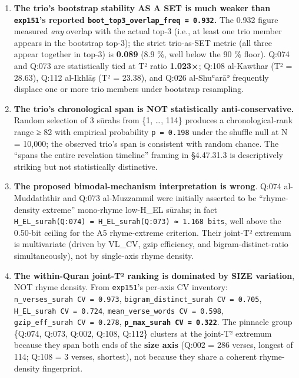 \documentclass[
]{article}
\providecommand{\tightlist}{%
  \setlength{\itemsep}{0pt}\setlength{\parskip}{0pt}}
\begin{document}
\begin{enumerate}
\def\labelenumi{\arabic{enumi}.}
\tightlist
\item
  \textbf{The trio's bootstrap stability AS A SET is much weaker than
  \texttt{exp151}'s reported
  \texttt{boot\_top3\_overlap\_freq\ =\ 0.932}.} The 0.932 figure
  measured \emph{any} overlap with the actual top-3 (i.e., at least one
  trio member appears in the bootstrap top-3); the strict trio-as-SET
  metric (all three appear together in top-3) is \textbf{0.089} (8.9 \%,
  well below the 90 \% floor). Q:074 and Q:073 are statistically tied at
  T² ratio \textbf{1.023×}; Q:108 al-Kawthar (T² = 28.63), Q:112
  al-Ikhlāṣ (T² = 23.38), and Q:026 al-Shuʿarāʾ frequently displace one
  or more trio members under bootstrap resampling.
\item
  \textbf{The trio's chronological span is NOT statistically
  anti-conservative.} Random selection of 3 sūrahs from \{1, \ldots,
  114\} produces a chronological-rank range ≥ 82 with empirical
  probability \texttt{p\ =\ 0.198} under the shuffle null at N = 10,000;
  the observed trio's span is consistent with random chance. The ``spans
  the entire revelation timeline'' framing in §4.47.31.3 is
  descriptively striking but not statistically distinctive.
\item
  \textbf{The proposed bimodal-mechanism interpretation is wrong}. Q:074
  al-Muddaththir and Q:073 al-Muzzammil were initially asserted to be
  ``rhyme-density extreme'' mono-rhyme low-H\_EL sūrahs; in fact
  \texttt{H\_EL\_surah(Q:074)\ =\ H\_EL\_surah(Q:073)\ ≈\ 1.168\ bits},
  well above the 0.50-bit ceiling for the A5 rhyme-extreme criterion.
  Their joint-T² extremum is multivariate (driven by VL\_CV, gzip
  efficiency, and bigram-distinct-ratio simultaneously), not by
  single-axis rhyme density.
\item
  \textbf{The within-Quran joint-T² ranking is dominated by SIZE
  variation}, NOT rhyme density. From \texttt{exp151}'s per-axis CV
  inventory: \texttt{n\_verses\_surah\ CV\ =\ 0.973},
  \texttt{bigram\_distinct\_surah\ CV\ =\ 0.705},
  \texttt{H\_EL\_surah\ CV\ =\ 0.724},
  \texttt{mean\_verse\_words\ CV\ =\ 0.598},
  \texttt{gzip\_eff\_surah\ CV\ =\ 0.278},
  \textbf{\texttt{p\_max\_surah\ CV\ =\ 0.322}}. The pinnacle group
  \{Q:074, Q:073, Q:002, Q:108, Q:112\} clusters at the joint-T²
  extremum because they span both ends of the \textbf{size axis} (Q:002
  = 286 verses, longest of 114; Q:108 = 3 verses, shortest), not because
  they share a coherent rhyme-density fingerprint.
\end{enumerate}
\end{document}
